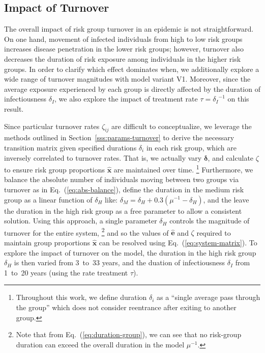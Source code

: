 \subsection{Impact of Turnover}\label{ss:exp-turnover}
The overall impact of risk group turnover in an epidemic is not straightforward.
On one hand, movement of infected individuals from high to low risk groups
increases disease penetration in the lower risk groups;
however, turnover also decreases the duration of risk exposure
among individuals in the higher risk groups.
In order to clarify which effect dominates when, %
we additionally explore a wide range of turnover magnitudes with model variant V1.
Moreover, since the average exposure experienced by each group
is directly affected by the duration of infectiousness $\delta_I$, we also explore
the impact of treatment rate $\tau = {\delta_I}^{-1}$ on this result.
\par
Since particular turnover rates $\zeta_{ij}$ are difficult to conceptualize,
we leverage the methods outlined in Section~\ref{sss:params-turnover}
to derive the necessary transition matrix given specified durations $\delta_i$
in each risk group, which are inversely correlated to turnover rates.
That is, we actually vary $\bm{\delta}$, and calculate $\zeta$ to ensure
risk group proportions $\bm{\hat{x}}$ are maintained over time.%
\footnote{Throughout this work,
  we define duration $\delta_i$ as a ``single average pass through the group''
  which does not consider reentrance after exiting to another group.}
Furthermore, we balance the absolute number of individuals
moving between two groups via turnover as in Eq.~(\ref{eq:abs-balance}),
define the duration in the medium risk group as
a linear function of $\delta_H$ like:
$\delta_M = \delta_H + 0.3\left(\mu^{-1} - \delta_H\right)$, and
the leave the duration in the high risk group as a free parameter
to allow a consistent solution.
Using this approach, a single parameter $\delta_H$ controls
the magnitude of turnover for the entire system,%
\footnote{Note that from Eq.~(\ref{eq:duration-group}), we can see that
  no risk-group duration can exceed the overall duration in the model $\mu^{-1}$.}
and so the values of $\bm{\hat{e}}$ and $\zeta$ required
to maintain group proportions $\bm{\hat{x}}$
can be resolved using Eq.~(\ref{eq:system-matrix}).
To explore the impact of turnover on the model,
the duration in the high risk group $\delta_H$ is then varied from 3~to~33 years,
and the duation of infectiousness $\delta_I$ from 1~to~20 years (using the rate treatment $\tau$).
